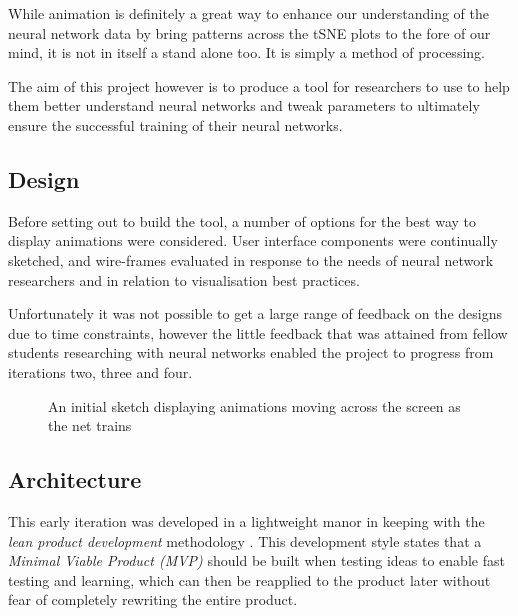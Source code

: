 \documentclass[a4paper,11pt,titlepage]{article}
\begin{document}
	While animation is definitely a great way to enhance our understanding of the neural network data by bring patterns across the tSNE plots to the fore of our mind, it is not in itself a stand alone too. It is simply a method of processing. 
	\par 
	The aim of this project however is to produce a tool for researchers to use to help them better understand neural networks and tweak parameters to ultimately ensure the successful training of their neural networks.
	\par 
	
	\subsection{Design}
	Before setting out to build the tool, a number of options for the best way to display animations were considered. User interface components were continually sketched, and wire-frames evaluated in response to the needs of neural network researchers and in relation to visualisation best practices. 
	\par 
	Unfortunately it was not possible to get a large range of feedback on the designs due to time constraints, however the little feedback that was attained from fellow students researching with neural networks enabled the project to progress from iterations two, three and four. 
	
	\begin{figure}[H]
    			\caption{An initial sketch displaying animations moving across the screen as the net trains}%
	\end{figure}		
	
	
	
	\subsection{Architecture}
	This early iteration was developed in a lightweight manor in keeping with the \textit{lean product development} methodology \cite{}. This development style states that a \textit{Minimal Viable Product (MVP)} should be built when testing ideas to enable fast testing and learning, which can then be reapplied to the product later without fear of completely rewriting the entire product.
	\par 
		
\end{document}
